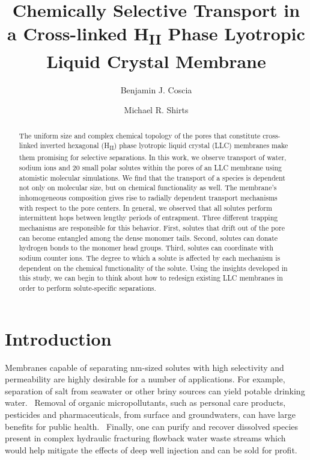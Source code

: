 \documentclass[journal=jpcbfk,manuscript=article]{achemso}
\title{Chemically Selective Transport in a Cross-linked H\textsubscript{II} Phase Lyotropic Liquid Crystal Membrane}
\author{Benjamin J. Coscia}
\affiliation{Department of Chemical and Biological Engineering, University of Colorado Boulder, Boulder, CO 80309, USA}
\author{Michael R. Shirts}
\affiliation{Department of Chemical and Biological Engineering, University of Colorado Boulder, Boulder, CO 80309, USA}
\begin{document}
  \graphicspath{{./figures/}}
  
  \begin{abstract}

  The uniform size and complex chemical topology of the pores that 
  constitute cross-linked inverted hexagonal (H\textsubscript{II})
  phase lyotropic liquid crystal (LLC) membranes make them promising
  for selective separations. In this work, we observe transport
  of water, sodium ions and 20 small polar solutes within the pores 
  of an LLC membrane using atomistic molecular simulations. We 
  find that the transport of a species is dependent not only on 
  molecular size, but on chemical functionality as well. The 
  membrane's inhomogeneous composition gives rise to radially dependent
  transport mechanisms with respect to the pore centers. In general, we 
  observed that all solutes perform intermittent hops between lengthy
  periods of entrapment. Three different trapping mechanisms are 
  responsible for this behavior. First, solutes that drift
  out of the pore can become entangled among the dense monomer
  tails. Second, solutes can donate hydrogen bonds to the monomer
  head groups. Third, solutes can coordinate with sodium counter ions.
  The degree to which a solute is affected by each mechanism is 
  dependent on the chemical functionality of the solute. Using the
  insights developed in this study, we can begin to think about 
  how to redesign existing LLC membranes in order to perform 
  solute-specific separations.
   
  \end{abstract}

  \section{Introduction}

  Membranes capable of separating nm-sized solutes with high selectivity and
  permeability are highly desirable for a number of applications. For example,
  separation of salt from seawater or other briny sources can yield potable
  drinking water.~\cite{fritzmann_state---art_2007} Removal of organic
  micropollutants, such as personal care products, pesticides and
  pharmaceuticals, from surface and groundwaters, can have large benefits for
  public health.~\cite{schwarzenbach_challenge_2006} Finally, one can purify and
  recover dissolved species present in complex hydraulic fracturing flowback
  water waste streams which would help mitigate the effects of deep well
  injection and can be sold for profit.~\cite{dischinger_application_2017} 
\end{document}
